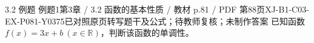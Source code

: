 \par\noindent\begin{minipage}{\linewidth}
\begin{bankitem}{3.2 例题 例题1}{第3章 / 3.2 函数的基本性质 / 教材 p.81 / PDF 第88页}{XJ-B1-C03-EX-P081-Y0375}{已对照原页转写题干及公式；待教师复核；未制作答案}
已知函数 $f(x)=3x+b\ (x\in\mathbb R)$，判断该函数的单调性。
\end{bankitem}
\end{minipage}\par\medskip
